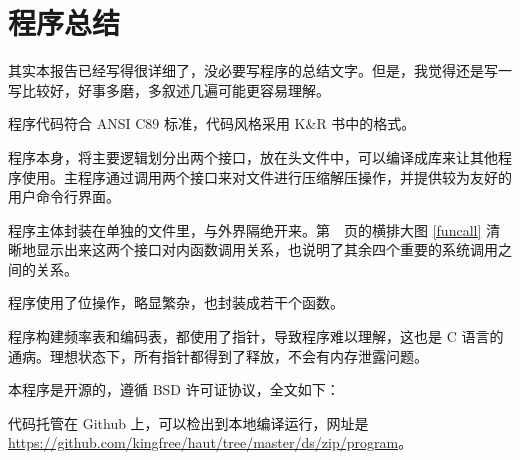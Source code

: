\section{程序总结}

其实本报告已经写得很详细了，没必要写程序的总结文字。但是，我觉得还是写一写比较好，好事多磨，多叙述几遍可能更容易理解。

程序代码符合 ANSI C89 标准，代码风格采用 K\&R 书中的格式。

程序本身，将主要逻辑划分出两个接口，放在头文件中，可以编译成库来让其他程序使用。主程序通过调用两个接口来对文件进行压缩解压操作，并提供较为友好的用户命令行界面。

程序主体封装在单独的文件里，与外界隔绝开来。第~\pageref{funcall}~页的横排大图 \ref{funcall} 清晰地显示出来这两个接口对内函数调用关系，也说明了其余四个重要的系统调用之间的关系。

程序使用了位操作，略显繁杂，也封装成若干个函数。

程序构建频率表和编码表，都使用了指针，导致程序难以理解，这也是 C 语言的通病。理想状态下，所有指针都得到了释放，不会有内存泄露问题。

本程序是开源的，遵循 BSD 许可证协议，全文如下：
\begin{quote}
\fontsize{8pt}{8pt}

\end{quote}

代码托管在 Github 上，可以检出到本地编译运行，网址是 \url{https://github.com/kingfree/haut/tree/master/ds/zip/program}。